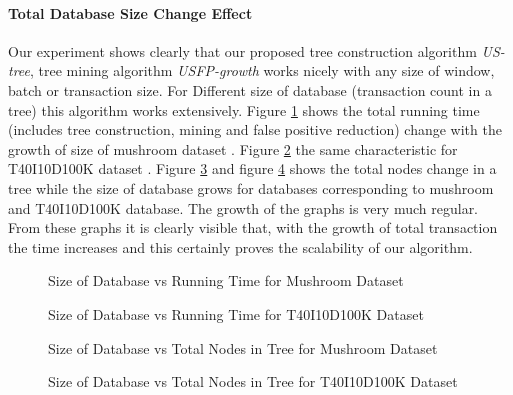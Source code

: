 	\paragraph{Total Database Size Change Effect}Our experiment shows clearly that our proposed tree construction algorithm \emph{US-tree}, tree mining algorithm \emph{USFP-growth} works nicely with any size of window, batch or transaction size. For Different size of database (transaction count in a tree) this algorithm works extensively. Figure \ref{result:g_m_const_tran} shows the total running time (includes tree construction, mining and false positive reduction) change with the growth of size of mushroom dataset . Figure \ref{result:g_t10_const_tran} the same characteristic for T40I10D100K dataset . Figure \ref{result:g_m_const_tran_mem} and figure \ref{result:g_t10_const_tran_mem} shows the total nodes change in a tree while the size of database grows for databases corresponding to mushroom and T40I10D100K database. The growth of the graphs is very much regular. From these graphs it is clearly visible that, with the growth of total transaction the time increases and this certainly proves the scalability of our algorithm. 
		\begin{figure}[h]
		\centering
			
		\caption{Size of Database vs Running Time for Mushroom Dataset }
		\label{result:g_m_const_tran}
		\end{figure}
		\begin{figure}[h]
		\centering
			
		\caption{Size of Database vs Running Time for T40I10D100K Dataset }
		\label{result:g_t10_const_tran}
		\end{figure}
%			
		\begin{figure}[h]
		\centering
			
		\caption{Size of Database vs Total Nodes in Tree for Mushroom Dataset }
		\label{result:g_m_const_tran_mem}
		\end{figure}
		\begin{figure}[h]
		\centering
			
		\caption{Size of Database vs Total Nodes in Tree for T40I10D100K Dataset }
		\label{result:g_t10_const_tran_mem}
		\end{figure}
%			
%		
